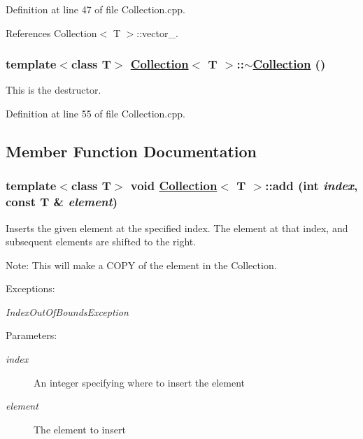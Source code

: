 Definition at line 47 of file Collection.cpp.

References Collection$<$ T $>$::vector\_\-.\hypertarget{classCollection_a2}{
\subsubsection[$\sim$Collection]{\setlength{\rightskip}{0pt plus 5cm}template$<$class T$>$ \hyperlink{classCollection}{Collection}$<$ T $>$::$\sim$\hyperlink{classCollection}{Collection} ()}}
\label{classCollection_a2}


This is the destructor. 

Definition at line 55 of file Collection.cpp.

\subsection{Member Function Documentation}
\hypertarget{classCollection_a5}{
\subsubsection[add]{\setlength{\rightskip}{0pt plus 5cm}template$<$class T$>$ void \hyperlink{classCollection}{Collection}$<$ T $>$::add (int {\em index}, const T \& {\em element})}}
\label{classCollection_a5}


Inserts the given element at the specified index. The element at that index, and subsequent elements are shifted to the right. \begin{Desc}
\item[Note:]This will make a COPY of the element in the Collection. \end{Desc}
\begin{Desc}
\item[Exceptions:]
\begin{description}
\item[{\em Index\-Out\-Of\-Bounds\-Exception}]\end{description}
\end{Desc}
\begin{Desc}
\item[Parameters:]
\begin{description}
\item[{\em index}]An integer specifying where to insert the element \item[{\em element}]The element to insert \end{description}
\end{Desc}



